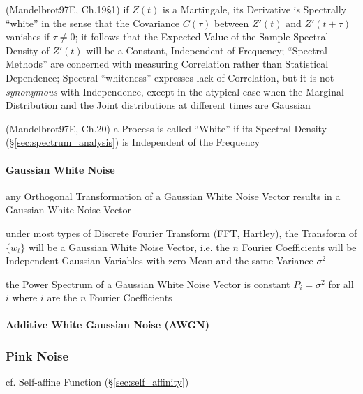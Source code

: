 (Mandelbrot97E, Ch.19\S 1) if $Z(t)$ is a Martingale, its Derivative is
Spectrally ``white'' in the sense that the Covariance $C(\tau)$ between $Z'(t)$
and $Z'(t + \tau)$ vanishes if $\tau \neq 0$; it follows that the Expected Value
of the Sample Spectral Density of $Z'(t)$ will be a Constant, Independent of
Frequency; ``Spectral Methods'' are concerned with measuring Correlation rather
than Statistical Dependence; Spectral ``whiteness'' expresses lack of
Correlation, but it is not \emph{synonymous} with Independence, except in the
atypical case when the Marginal Distribution and the Joint distributions at
different times are Gaussian

(Mandelbrot97E, Ch.20) a Process is called ``White'' if its Spectral Density
(\S\ref{sec:spectrum_analysis}) is Independent of the Frequency




\paragraph{Gaussian White Noise}\label{sec:gaussian_white_noise}\hfill

any Orthogonal Transformation of a Gaussian White Noise Vector results in a
Gaussian White Noise Vector

under most types of Discrete Fourier Transform (FFT, Hartley), the Transform of
$\{ w_t \}$ will be a Gaussian White Noise Vector, i.e. the $n$ Fourier
Coefficients will be Independent Gaussian Variables with zero Mean and the same
Variance $\sigma^2$

the Power Spectrum of a Gaussian White Noise Vector is constant $P_i = \sigma^2$
for all $i$ where $i$ are the $n$ Fourier Coefficients



\paragraph{Additive White Gaussian Noise (AWGN)}\label{sec:awgn}\hfill



\subsubsection{Pink Noise}\label{sec:pink_noise}

cf. Self-affine Function (\S\ref{sec:self_affinity})

